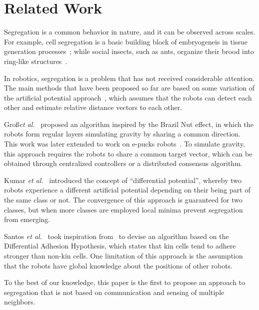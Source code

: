 \documentclass[conference]{IEEEtran}
\begin{document}
\section{Related Work}
Segregation is a common behavior in nature, and it can be observed across
scales. For example, cell segregation is a basic building block of embryogeneis
in tissue generation processes~\cite{batlle_molecular_2012,Steinberg1963}; while
social insects, such as ants, organize their brood into ring-like
structures~\cite{Franks1992}.

In robotics, segregation is a problem that has not received considerable
attention. The main methods that have been proposed so far are based on some
variation of the artificial potential approach~\cite{Spears2004}, which assumes
that the robots can detect each other and estimate relative distance vectors to
each other.

Gro\ss \emph{et al.}~\cite{gross_segregation_2009} proposed an
algorithm inspired by the Brazil Nut effect, in which the robots form regular
layers simulating gravity by sharing a common direction. This work was later
extended to work on e-pucks robots~\cite{Chen2012}. To simulate gravity, this
approach requires the robots to share a common target vector, which can be
obtained through centralized controllers or a distributed consensus algorithm.

Kumar \emph{et al.}~\cite{kumar_segregation_2010} introduced the concept of
``differential potential'', whereby two robots experience a different artificial
potential depending on their being part of the same class or not. The
convergence of this approach is guaranteed for two classes, but when more
classes are employed local minima prevent segregation from emerging.

Santos \emph{et al.}~\cite{santos_segregation_2014} took inspiration
from~\cite{kumar_segregation_2010} to devise an algorithm based on the
Differential Adhesion Hypothesis, which states that kin cells tend to adhere
stronger than non-kin cells. One limitation of this approach is the assumption
that the robots have global knowledge about the positions of other robots.

To the best of our knowledge, this paper is the first to propose an approach to
segregation that is not based on communication and sensing of multiple
neighbors.




\end{document}
